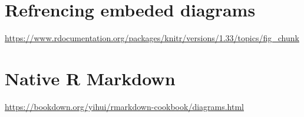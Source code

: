 \documentclass[
  12pt,
  a4paper,
  12pt,
  oneside,
  openany]{book}
\begin{document}
\hypertarget{refrencing-embeded-diagrams}{%
\section{Refrencing embeded diagrams}\label{refrencing-embeded-diagrams}}

\url{https://www.rdocumentation.org/packages/knitr/versions/1.33/topics/fig_chunk}

\hypertarget{native-r-markdown}{%
\section{Native R Markdown}\label{native-r-markdown}}

\url{https://bookdown.org/yihui/rmarkdown-cookbook/diagrams.html}

  
\end{document}
